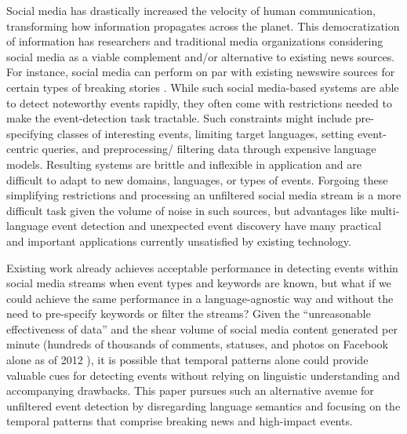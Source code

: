 \documentclass{sig-alternate}
\begin{document}
Social media has drastically increased the velocity of human communication, transforming how information propagates across the planet. 
This democratization of information has researchers and traditional media organizations considering social media as a viable complement and/or alternative to existing news sources.
For instance, social media can perform on par with existing newswire sources for certain types of breaking stories \cite{petrovic2013can}.
While such social media-based systems are able to detect noteworthy events rapidly, they often come with restrictions needed to make the event-detection task tractable. 
Such constraints might include pre-specifying classes of interesting events, limiting target languages, setting event-centric queries, and preprocessing/ filtering data through expensive language models.
Resulting systems are brittle and inflexible in application and are difficult to adapt to new domains, languages, or types of events.
Forgoing these simplifying restrictions and processing an unfiltered social media stream is a more difficult task given the volume of noise in such sources, but advantages like multi-language event detection and unexpected event discovery have many practical and important applications currently  unsatisfied by existing technology.

Existing work already achieves acceptable performance in detecting events within social media streams when event types and keywords are known, but what if we could achieve the same performance in a language-agnostic way and without the need to pre-specify keywords or filter the streams?
Given the ``unreasonable effectiveness of data'' and the shear volume of social media content  generated per minute (hundreds of thousands of comments, statuses, and photos on Facebook alone as of 2012 \cite{Pring2012}), it is possible that temporal patterns alone could provide valuable cues for detecting events without relying on linguistic understanding and accompanying drawbacks.
This paper pursues such an alternative avenue for unfiltered event detection by disregarding language semantics and focusing on the temporal patterns that comprise breaking news and high-impact events.
\end{document}
